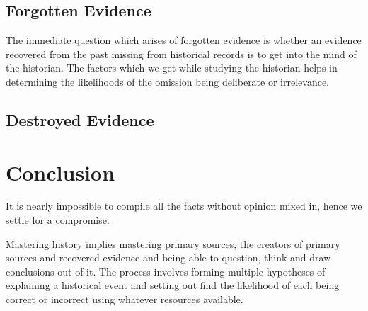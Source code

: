 \documentclass[a4paper]{article}
\begin{document}
\subsection{Forgotten Evidence}

The immediate question which arises of forgotten evidence is whether an
evidence recovered from the past missing from historical records is to
get into the mind of the historian. The factors which we get while
studying the historian helps in determining the likelihoods of the
omission being deliberate or irrelevance.

\subsection{Destroyed Evidence}



\section{Conclusion}

It is nearly impossible to compile all the facts without opinion mixed
in, hence we settle for a compromise. 

Mastering history implies mastering primary sources, the creators of
primary sources and recovered evidence and being able to question, think
and draw conclusions out of it.  
The process involves forming multiple hypotheses of explaining a
historical event and setting out find the likelihood of each being
correct or incorrect using whatever resources available.


\printbibliography 
\end{document}
